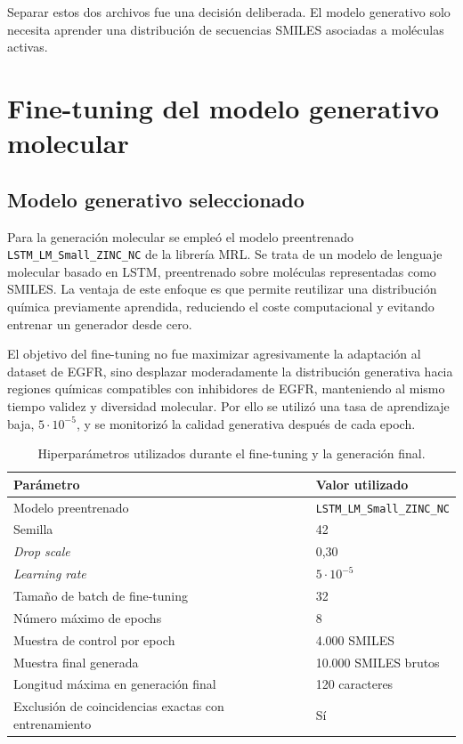 \documentclass[IB]{TFUOC}%
\begin{document}
Separar estos dos archivos fue una decisión deliberada. El modelo generativo solo necesita aprender una distribución de secuencias SMILES asociadas a moléculas activas.

\section{Fine-tuning del modelo generativo molecular}

\subsection{Modelo generativo seleccionado}

Para la generación molecular se empleó el modelo preentrenado \texttt{LSTM\_LM\_Small\_ZINC\_NC} de la librería MRL. Se trata de un modelo de lenguaje molecular basado en LSTM, preentrenado sobre moléculas representadas como SMILES. La ventaja de este enfoque es que permite reutilizar una distribución química previamente aprendida, reduciendo el coste computacional y evitando entrenar un generador desde cero.

El objetivo del fine-tuning no fue maximizar agresivamente la adaptación al dataset de EGFR, sino desplazar moderadamente la distribución generativa hacia regiones químicas compatibles con inhibidores de EGFR, manteniendo al mismo tiempo validez y diversidad molecular. Por ello se utilizó una tasa de aprendizaje baja, $5 \cdot 10^{-5}$, y se monitorizó la calidad generativa después de cada epoch.

\begin{table}[H]
    \centering
    \small
    \begin{tabular}{p{5.5cm} p{6cm}}
        \hline
        \textbf{Parámetro} & \textbf{Valor utilizado} \\
        \hline
        Modelo preentrenado & \texttt{LSTM\_LM\_Small\_ZINC\_NC} \\
        Semilla & 42 \\
        \textit{Drop scale} & 0,30 \\
        \textit{Learning rate} & $5 \cdot 10^{-5}$ \\
        Tamaño de batch de fine-tuning & 32 \\
        Número máximo de epochs & 8 \\
        Muestra de control por epoch & 4.000 SMILES \\
        Muestra final generada & 10.000 SMILES brutos \\
        Longitud máxima en generación final & 120 caracteres \\
        Exclusión de coincidencias exactas con entrenamiento & Sí \\
        \hline
    \end{tabular}
    \caption{Hiperparámetros utilizados durante el fine-tuning y la generación final.}
    \label{tab:hiperparametros_mrl}
\end{table}
\end{document}
